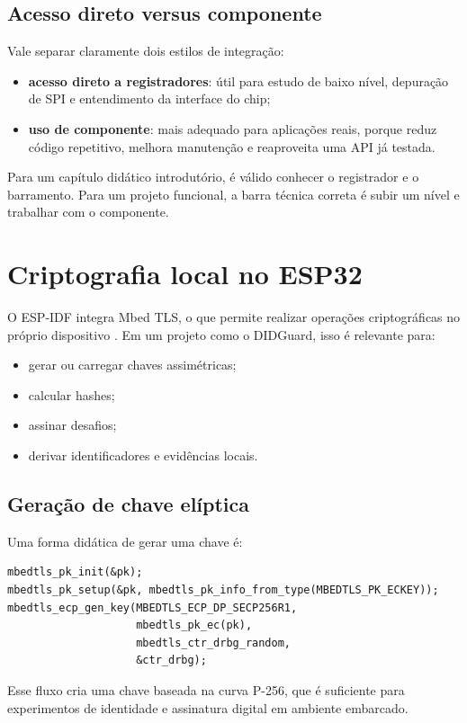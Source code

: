 \subsection{Acesso direto versus componente}
Vale separar claramente dois estilos de integração:
\begin{itemize}[leftmargin=*]
  \item \textbf{acesso direto a registradores}: útil para estudo de baixo nível, depuração de SPI e entendimento da interface do chip;
  \item \textbf{uso de componente}: mais adequado para aplicações reais, porque reduz código repetitivo, melhora manutenção e reaproveita uma API já testada.
\end{itemize}

Para um capítulo didático introdutório, é válido conhecer o registrador e o barramento. Para um projeto funcional, a barra técnica correta é subir um nível e trabalhar com o componente.

\section{Criptografia local no ESP32}
O ESP-IDF integra Mbed TLS, o que permite realizar operações criptográficas no próprio dispositivo \citep{espidf_mbedtls}. Em um projeto como o DIDGuard, isso é relevante para:
\begin{itemize}[leftmargin=*]
  \item gerar ou carregar chaves assimétricas;
  \item calcular hashes;
  \item assinar desafios;
  \item derivar identificadores e evidências locais.
\end{itemize}

\subsection{Geração de chave elíptica}
Uma forma didática de gerar uma chave é:
\begin{verbatim}
mbedtls_pk_init(&pk);
mbedtls_pk_setup(&pk, mbedtls_pk_info_from_type(MBEDTLS_PK_ECKEY));
mbedtls_ecp_gen_key(MBEDTLS_ECP_DP_SECP256R1,
                    mbedtls_pk_ec(pk),
                    mbedtls_ctr_drbg_random,
                    &ctr_drbg);
\end{verbatim}

Esse fluxo cria uma chave baseada na curva P-256, que é suficiente para experimentos de identidade e assinatura digital em ambiente embarcado.

